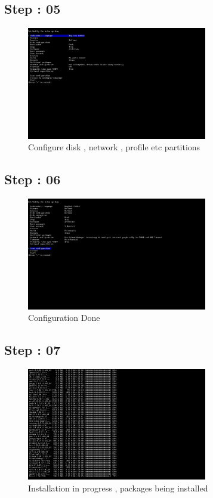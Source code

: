 \documentclass{article}
\begin{document}
\subsection{Step : 05}
\begin{figure}[H]
    \centering
    \includegraphics[width=0.7\textwidth]{5.png}
    \caption{Configure disk , network , profile etc partitions}
    \label{fig:install_Arch5}
\end{figure}

\subsection{Step : 06}
\begin{figure}[H]
    \centering
    \includegraphics[width=0.7\textwidth]{6.png}
    \caption{Configuration Done}
    \label{fig:install_Arch6}
\end{figure}

\subsection{Step : 07}
\begin{figure}[H]
    \centering
    \includegraphics[width=0.7\textwidth]{7.png}
    \caption{Installation in progress , packages being installed }
    \label{fig:install_Arch7}
\end{figure}
\end{document}
